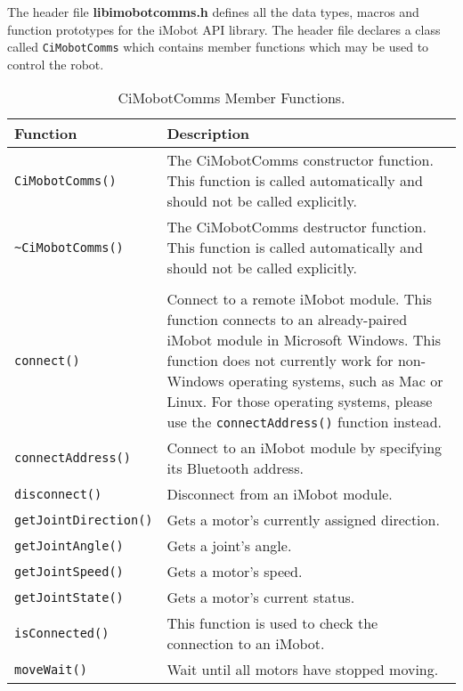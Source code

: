 \noindent
The header file {\bf libimobotcomms.h} defines all the data types, macros 
and function prototypes for the iMobot API library. The header file
declares a class called \texttt{CiMobotComms} which contains member functions which
may be used to control the robot.

\begin{table}[!hp]
\begin{center}
\caption{CiMobotComms Member Functions.}
\begin{tabular}{p{38 mm}p{77 mm}}
\hline
Function & Description \\
\hline
\texttt{CiMobotComms()} \dotfill & The CiMobotComms constructor function. This function
is called automatically and should not be called explicitly. \\
\texttt{\textasciitilde CiMobotComms()} \dotfill & The CiMobotComms destructor function. This function
is called automatically and should not be called explicitly. \\
& \\
\texttt{connect()} \dotfill & Connect to a remote iMobot module. This function connects to an already-paired iMobot module in Microsoft Windows. This function does not currently work for non-Windows operating systems, such as Mac or Linux. For those operating systems, please use the \texttt{connectAddress()} function instead. \\
\texttt{connectAddress()} \dotfill & Connect to an iMobot module by specifying its Bluetooth address. \\
\texttt{disconnect()} \dotfill & Disconnect from an iMobot module. \\
\texttt{getJointDirection()} \dotfill & Gets a motor's currently assigned direction. \\
\texttt{getJointAngle()} \dotfill & Gets a joint's angle. \\
\texttt{getJointSpeed()} \dotfill & Gets a motor's speed. \\
\texttt{getJointState()} \dotfill & Gets a motor's current status. \\
\texttt{isConnected()} \dotfill & This function is used to check the connection to an iMobot. \\
\texttt{moveWait()} \dotfill & Wait until all motors have stopped moving. \\

\end{tabular}
\end{center}
\end{table}
